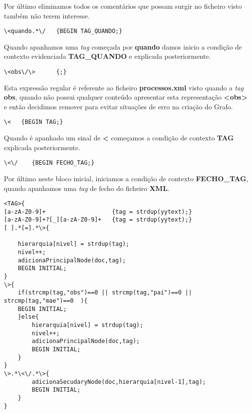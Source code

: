 \documentclass{report}
\begin{document}
    Por último eliminamos todos os comentários que possam surgir no ficheiro visto também não terem interesse. 

\begin{verbatim}
\<quando.*\/   {BEGIN TAG_QUANDO;}
\end{verbatim}
    
    Quando apanhamos uma \textit{tag} começada por \textbf{quando} damos inicio a condição de contexto evidenciada \textbf{TAG\_QUANDO} e explicada posteriormente.

\begin{verbatim}
\<obs\/\>      {;}
\end{verbatim}

    Esta expressão regular é referente ao ficheiro \textbf{processos.xml} visto quando a \textit{tag} \textbf{obs}, quando não possui qualquer conteúdo apresentar esta representação \textbf{\textless obs\/\textgreater} e então decidimos remover para evitar situações de erro na criação do Grafo.

\begin{verbatim}
\<   {BEGIN TAG;}
\end{verbatim}
    
    Quando é apanhado um sinal de \textbf{\textless} começamos a condição de contexto \textbf{TAG} explicada posteriormente.

\begin{verbatim}
\<\/    {BEGIN FECHO_TAG;}
\end{verbatim}

    Por último neste bloco inicial, iniciamos a condição de contexto \textbf{FECHO\_TAG}, quando apanhamos uma \textit{tag} de fecho do ficheiro \textbf{XML}.


\begin{verbatim}
<TAG>{
[a-zA-Z0-9]+                   {tag = strdup(yytext);}
[a-zA-Z0-9]+?[_][a-zA-Z0-9]+   {tag = strdup(yytext);}
[ ].*[=].*\>{   
                                                   
    hierarquia[nivel] = strdup(tag);
    nivel++;
    adicionaPrincipalNode(doc,tag);
    BEGIN INITIAL;
}
\>{
    if(strcmp(tag,"obs")==0 || strcmp(tag,"pai")==0 || strcmp(tag,"mae")==0  ){
    BEGIN INITIAL;
    }else{
        hierarquia[nivel] = strdup(tag);
        nivel++;
        adicionaPrincipalNode(doc,tag);
        BEGIN INITIAL;
    }
}
\>.*\<\/.*\>{
        adicionaSecudaryNode(doc,hierarquia[nivel-1],tag);
        BEGIN INITIAL;
    }
}
\end{verbatim}
\end{document}
